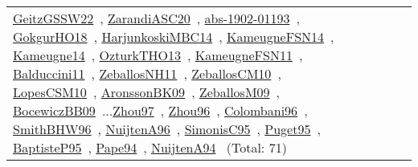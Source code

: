 {\begin{longtable}{p{3cm}r>{\raggedright\arraybackslash}p{6cm}>{\raggedright\arraybackslash}p{6cm}>{\raggedright\arraybackslash}p{8cm}}
\href{../works/GeitzGSSW22.pdf}{GeitzGSSW22}~\cite{GeitzGSSW22}, \href{../works/ZarandiASC20.pdf}{ZarandiASC20}~\cite{ZarandiASC20}, \href{../works/abs-1902-01193.pdf}{abs-1902-01193}~\cite{abs-1902-01193}, \href{../works/GokgurHO18.pdf}{GokgurHO18}~\cite{GokgurHO18}, \href{../works/HarjunkoskiMBC14.pdf}{HarjunkoskiMBC14}~\cite{HarjunkoskiMBC14}, \href{../works/KameugneFSN14.pdf}{KameugneFSN14}~\cite{KameugneFSN14}, \href{../works/Kameugne14.pdf}{Kameugne14}~\cite{Kameugne14}, \href{../works/OzturkTHO13.pdf}{OzturkTHO13}~\cite{OzturkTHO13}, \href{../works/KameugneFSN11.pdf}{KameugneFSN11}~\cite{KameugneFSN11}, \href{../works/Balduccini11.pdf}{Balduccini11}~\cite{Balduccini11}, \href{../works/ZeballosNH11.pdf}{ZeballosNH11}~\cite{ZeballosNH11}, \href{../works/ZeballosCM10.pdf}{ZeballosCM10}~\cite{ZeballosCM10}, \href{../works/LopesCSM10.pdf}{LopesCSM10}~\cite{LopesCSM10}, \href{../works/AronssonBK09.pdf}{AronssonBK09}~\cite{AronssonBK09}, \href{../works/ZeballosM09.pdf}{ZeballosM09}~\cite{ZeballosM09}, \href{../works/BocewiczBB09.pdf}{BocewiczBB09}~\cite{BocewiczBB09}...\href{../works/Zhou97.pdf}{Zhou97}~\cite{Zhou97}, \href{../works/Zhou96.pdf}{Zhou96}~\cite{Zhou96}, \href{../works/Colombani96.pdf}{Colombani96}~\cite{Colombani96}, \href{../works/SmithBHW96.pdf}{SmithBHW96}~\cite{SmithBHW96}, \href{../works/NuijtenA96.pdf}{NuijtenA96}~\cite{NuijtenA96}, \href{../works/SimonisC95.pdf}{SimonisC95}~\cite{SimonisC95}, \href{../works/Puget95.pdf}{Puget95}~\cite{Puget95}, \href{../works/BaptisteP95.pdf}{BaptisteP95}~\cite{BaptisteP95}, \href{../works/Pape94.pdf}{Pape94}~\cite{Pape94}, \href{../works/NuijtenA94.pdf}{NuijtenA94}~\cite{NuijtenA94} (Total: 71)\\

\end{longtable}}
